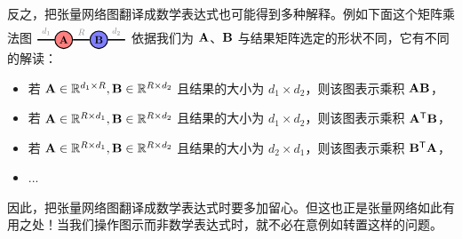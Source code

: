 反之，把张量网络图翻译成数学表达式也可能得到多种解释。例如下面这个矩阵乘法图
$
\begin{tikzpicture}[baseline=\baseline]
   \tikzset{tensor/.style = {minimum size = 0.5cm,shape = circle,thick,draw=black,inner sep = 0pt}, edge/.style = {thick,line width=.4mm},every loop/.style={}}
    \def\y{0}
    \def\x{0}
    \node[tensor,fill=red!50!white] (A) at (\x,\y){\scalebox{0.85}{$\Ab$}};
    \node[tensor,fill=blue!50!white] (B) at (\x+1,\y){\scalebox{0.85}{$\Bb$}};
    \draw[edge] (A) -- (B) node [midway,above] {\scalebox{0.7}{\dimcolor{$R$}}};
    \draw[edge] (\x-0.25,\y) -- (\x-0.75,\y) node [midway,above] {\scalebox{0.7}{\dimcolor{$d_1$}}};
    \draw[edge] (\x+1.25,\y) -- (\x+1.75,\y) node [midway,above] {\scalebox{0.7}{\dimcolor{$d_2$}}};
\end{tikzpicture}
$
依据我们为 $\mathbf{A}$、$\mathbf{B}$ 与结果矩阵选定的形状不同，它有不同的解读：
\begin{itemize}
    \item 若 $\mathbf{A}\in\mathbb{R}^{d_1\times R}, \mathbf{B}\in\mathbb{R}^{R\times d_2}$ 且结果的大小为 $d_1 \times d_2$，则该图表示乘积 $\mathbf{A}\mathbf{B}$，
    \item 若 $\mathbf{A}\in\mathbb{R}^{R\times d_1}, \mathbf{B}\in\mathbb{R}^{R\times d_2}$ 且结果的大小为 $d_1 \times d_2$，则该图表示乘积 $\mathbf{A}^{\mathsf{T}}\mathbf{B}$，
    \item 若 $\mathbf{A}\in\mathbb{R}^{R\times d_1}, \mathbf{B}\in\mathbb{R}^{R\times d_2}$ 且结果的大小为 $d_2 \times d_1$，则该图表示乘积 $\mathbf{B}^{\mathsf{T}}\mathbf{A}$，
    \item ...
\end{itemize}
因此，把张量网络图翻译成数学表达式时要多加留心。但这也正是张量网络如此有用之处！当我们操作图示而非数学表达式时，就不必在意例如转置这样的问题。

